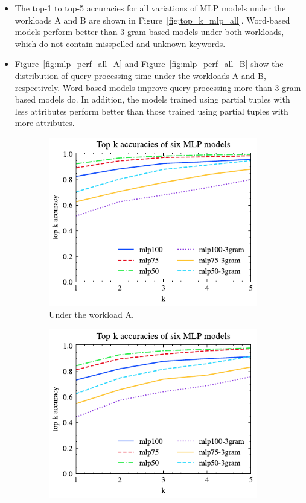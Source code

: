 \documentclass[conference]{IEEEtran}
\begin{document}
\begin{itemize}
	\item The top-1 to top-5 accuracies for all variations of MLP models under the workloads A and B are shown in Figure~\ref{fig:top_k_mlp_all}. Word-based models perform better than 3-gram based models under both workloads, which do not contain misspelled and unknown keywords.
	\item Figure~\ref{fig:mlp_perf_all_A} and Figure~\ref{fig:mlp_perf_all_B} show the distribution of query processing time under the workloads A and B, respectively. Word-based models improve query processing more than 3-gram based models do. In addition, the models trained using partial tuples with less attributes perform better than those trained using partial tuples with more attributes.
\end{itemize}
\begin{figure}[!th]
	\centering
	\begin{subfigure}{0.45\textwidth}
		\centering
%		
		\includegraphics[]{graphics/top_k_mlp_A.pdf}
		\caption{Under the workload A.}
		\label{fig:top_k_mlp_A}
	\end{subfigure}
	\hfill
	\begin{subfigure}{0.45\textwidth}
		\centering
%		
		\includegraphics[]{graphics/top_k_mlp_B.pdf}

\end{subfigure}
\end{figure}
\end{document}
